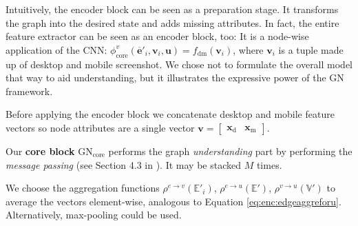 Intuitively, the encoder block can be seen as a preparation stage. It transforms the graph into the desired state and adds missing attributes. In fact, the entire feature extractor can be seen as an encoder block, too: It is a node-wise application of the CNN: $\phi^v_\text{core}\left(\bm{\overline{e}}'_i,\bm{v}_i,\bm{u}\right)=f_\text{dm}(\bm{v}_i)$, where $\bm{v}_i$ is a tuple made up of desktop and mobile screenshot. We chose not to formulate the overall model that way to aid understanding, but it illustrates the expressive power of the GN framework.

Before applying the encoder block we concatenate desktop and mobile feature vectors so node attributes are a single vector $\bm{v}=\begin{bmatrix}\bm{x}_\text{d} & \bm{x}_\text{m}\end{bmatrix}$.

Our \textbf{core block} $\text{GN}_\text{core}$ performs the graph \textit{understanding} part by performing the \textit{message passing} (see Section 4.3 in \cite{deepmind:graphnets}). It may be stacked $M$ times. 

We choose the aggregation functions $\rho^{e\rightarrow v}\left(\mathbb{E}'_i\right)$, $\rho^{e\rightarrow u}\left(\mathbb{E}'\right)$, $\rho^{v\rightarrow u}\left(\mathbb{V}'\right)$ to average the vectors element-wise, analogous to Equation \ref{eq:enc:edgeaggreforu}. Alternatively, max-pooling could be used.

